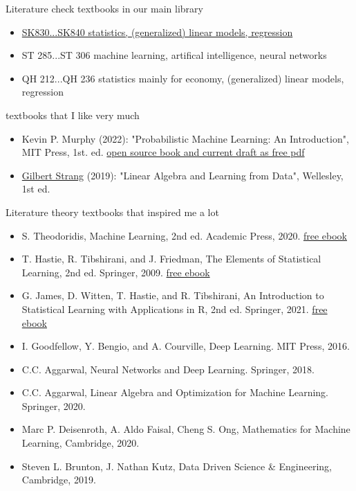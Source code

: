 \documentclass[mathserif, aspectratio=43]{intbeamer}
\begin{document}
%
%
%
\begin{frame}{Literature}
  check textbooks in our main library
  \begin{itemize}
    \item \href{https://find.ub.uni-rostock.de/sk830}{SK830...SK840 statistics, (generalized) linear models, regression}
    \item ST 285...ST 306 machine learning, artifical intelligence, neural networks
    \item QH 212...QH 236 statistics mainly for economy, (generalized) linear models, regression
  \end{itemize}
  textbooks that I like very much
  \begin{itemize}
    \item Kevin P. Murphy (2022): "Probabilistic Machine Learning: An Introduction", MIT Press, 1st. ed.
    \href{https://probml.github.io/pml-book/book1.html}{open source book and current draft as free pdf}
    \item \href{https://math.mit.edu/~gs/}{Gilbert Strang} (2019): "Linear Algebra and Learning from Data", Wellesley, 1st ed.
  \end{itemize}
\end{frame}

\begin{frame}{Literature}
  theory textbooks that inspired me a lot
  \begin{itemize}
    \item S. Theodoridis, Machine Learning, 2nd ed. Academic Press, 2020.
    \href{https://www.sciencedirect.com/book/9780128188033/machine-learning}{free ebook}
    \item T. Hastie, R. Tibshirani, and J. Friedman, The Elements of Statistical Learning, 2nd ed. Springer, 2009.
    \href{https://hastie.su.domains/ElemStatLearn/}{free ebook}
    \item G. James, D. Witten, T. Hastie, and R. Tibshirani, An Introduction to Statistical Learning with Applications in R, 2nd ed. Springer, 2021. \href{https://www.statlearning.com/}{free ebook}
    \item I. Goodfellow, Y. Bengio, and A. Courville, Deep Learning. MIT Press, 2016.
    \item C.C. Aggarwal, Neural Networks and Deep Learning. Springer, 2018.
    \item C.C. Aggarwal, Linear Algebra and Optimization for Machine Learning. Springer, 2020.
    \item Marc P. Deisenroth, A. Aldo Faisal, Cheng S. Ong, Mathematics for Machine Learning, Cambridge, 2020.
    \item Steven L. Brunton, J. Nathan Kutz, Data Driven Science \& Engineering, Cambridge, 2019.
  \end{itemize}
\end{frame}
\end{document}
